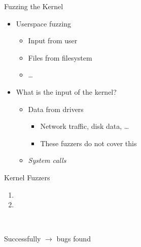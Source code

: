 \begin{frame}{Fuzzing the Kernel}

  \begin{itemize}
    \item Userspace fuzzing
    \begin{itemize}
      \item Input from user
      \item Files from filesystem
      \item \dots
    \end{itemize}

    \pause

    \item What is the input of the kernel?

    \pause

    \begin{itemize}
      \item Data from drivers
      \begin{itemize}
	\item Network traffic, disk data, \dots

	\pause

	\item These fuzzers do not cover this
      \end{itemize}

      \pause

      \item \emph{System calls}
    \end{itemize}
  \end{itemize}

\end{frame}

\begin{frame}{Kernel Fuzzers}

  \begin{enumerate}
    \item \trin
    \item \syz
  \end{enumerate}

  \pause
  \medskip

  \\[.9ex]

  \pause

  \hspace{1.8em} Successfully $\rightarrow$ bugs found

\end{frame}


